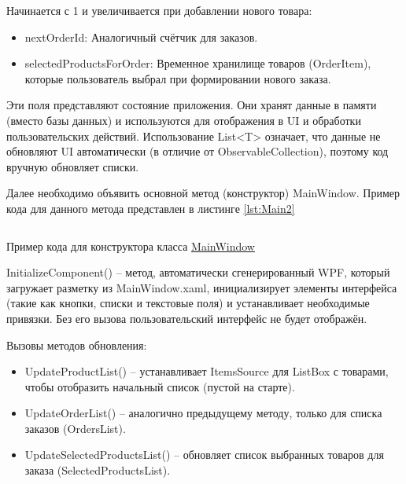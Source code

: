 \documentclass[12pt]{article}
\newcommand{\colorGIT}[1]{\textcolor{CtpLavender}{#1}}
\renewcommand{\texttt}[1]{{\small\ttfamily #1}}
\newenvironment{code}{\captionsetup{type=listing}}{}
\numberwithin{listing}{section}
\numberwithin{figure}{section}
\begin{document}
\noindent Начинается с 1 и увеличивается при добавлении нового товара:
\begin{itemize}
	\item \texttt{nextOrderId}: Аналогичный счётчик для заказов.
	\item \texttt{selectedProductsForOrder}: Временное хранилище товаров (\texttt{OrderItem}), которые пользователь выбрал при формировании нового заказа.
\end{itemize}

Эти поля представляют состояние приложения. Они хранят данные в памяти (вместо базы данных) и используются для отображения в \texttt{UI} и обработки пользовательских действий. Использование \texttt{List<T>} означает, что данные не обновляют \texttt{UI} автоматически (в отличие от \texttt{Observable\-Collection}), поэтому код вручную обновляет списки.

{}
Далее необходимо объявить основной метод (конструктор) \texttt{MainWindow}.
Пример кода для данного метода представлен в листинге \ref{lst:Main2}

\begin{code}
	\inputminted[firstline=24, lastline=30]{csharp}{../../3lab/StoreManager/MainWindow.xaml.cs}
	\caption{Пример кода для конструктора класса \colorGIT{\href{https://github.com/WebMasterIT/Csharp_Labs/blob/ec375afd16c0647b337cf3d8a79c8bef904fc1be/3lab/StoreManager/MainWindow.xaml.cs\#L24-L30}{MainWindow}}}
	\label{lst:Main2}
\end{code}

\texttt{InitializeComponent()} -- метод, автоматически сгенерированный \texttt{WPF}, который загружает разметку из \texttt{MainWindow.xaml}, инициализирует элементы интерфейса (такие как кнопки, списки и текстовые поля) и устанавливает необходимые привязки. Без его вызова пользовательский интерфейс не будет отображён.

\noindent Вызовы методов обновления:
\begin{itemize}
	\item \texttt{UpdateProductList()} -- устанавливает \texttt{ItemsSource} для \texttt{ListBox} с товарами, чтобы отобразить начальный список (пустой на старте).
	\item \texttt{UpdateOrderList()} -- аналогично предыдущему методу, только для списка заказов (\texttt{Or\-dersList}).
	\item \texttt{UpdateSelectedProductsList()} -- обновляет список выбранных товаров для заказа (\texttt{Sel\-ected\-ProductsList}).
\end{itemize}
\end{document}
